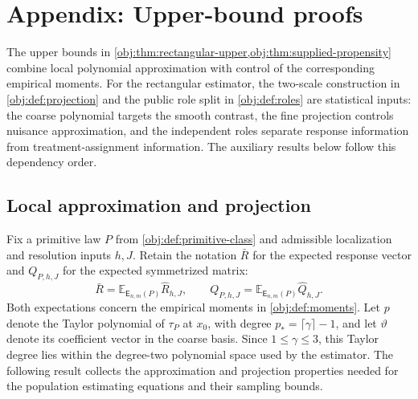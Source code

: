 \section{Appendix: Upper-bound proofs}\label{sec:upper-bound-proofs}

The upper bounds in \cref{obj:thm:rectangular-upper,obj:thm:supplied-propensity} combine local polynomial approximation with control of the corresponding empirical moments. For the rectangular estimator, the two-scale construction in \cref{obj:def:projection} and the public role split in \cref{obj:def:roles} are statistical inputs: the coarse polynomial targets the smooth contrast, the fine projection controls nuisance approximation, and the independent roles separate response information from treatment-assignment information. The auxiliary results below follow this dependency order.

\subsection{Local approximation and projection}

Fix a primitive law \(P\) from \cref{obj:def:primitive-class} and admissible localization and resolution inputs \(h,J\). Retain the notation \(\bar R\) for the expected response vector and \(Q_{P,h,J}\) for the expected symmetrized matrix:
\[
\bar R=\mathbb E_{\mathsf E_{n,m}(P)}\widehat R_{h,J},
\qquad
Q_{P,h,J}=\mathbb E_{\mathsf E_{n,m}(P)}\widehat Q_{h,J}.
\]
Both expectations concern the empirical moments in \cref{obj:def:moments}. Let \(p\) denote the Taylor polynomial of \(\tau_P\) at \(x_0\), with degree \(p_*=\lceil\gamma\rceil-1\), and let \(\vartheta\) denote its coefficient vector in the coarse basis. Since \(1\le\gamma\le3\), this Taylor degree lies within the degree-two polynomial space used by the estimator. The following result collects the approximation and projection properties needed for the population estimating equations and their sampling bounds.

